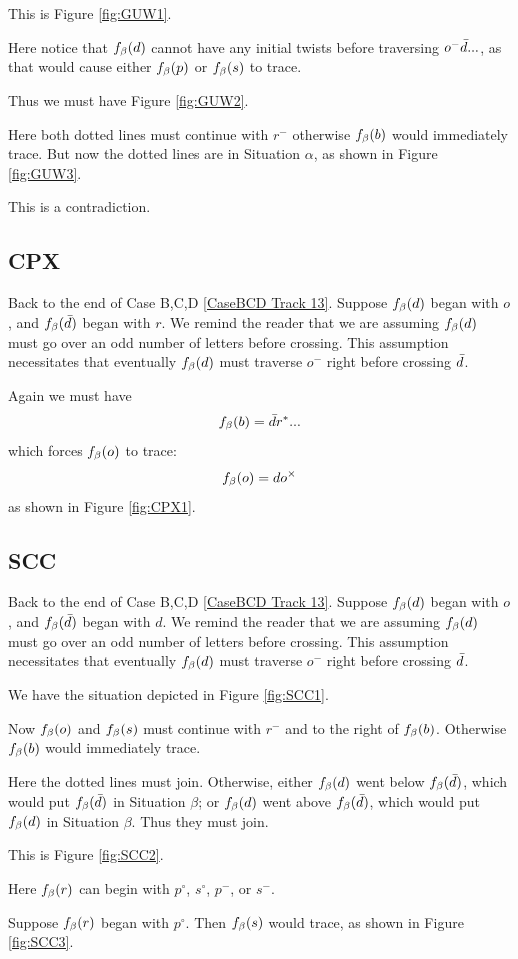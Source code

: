 This is Figure \ref{fig:GUW1}.

Here notice that $f_\beta(d)$ cannot have any initial twists before traversing $o^- \bar{d}...$, as that would cause either $f_\beta(p)$ or $f_\beta(s)$ to trace.

Thus we must have Figure \ref{fig:GUW2}.

Here both dotted lines must continue with $r^-$ otherwise $f_\beta(b)$ would immediately trace. But now the dotted lines are in Situation $\alpha$, as shown in Figure \ref{fig:GUW3}.

This is a contradiction.

\subsection{CPX}\label{CPX}
Back to the end of Case B,C,D \ref{CaseBCD Track 13}.
Suppose $f_\beta(d)$ began with $o$, and $f_\beta(\bar{d})$ began with $r$. We remind the reader that we are assuming $f_\beta(d)$ must go over an odd number of letters before crossing. This assumption necessitates that eventually $f_\beta(d)$ must traverse $o^-$ right before crossing $\bar{d}$.

Again we must have
\[
f_\beta(b) = \bar{d} r^*...
\]
which forces $f_\beta(o)$ to trace:
\[
f_\beta(o) = d o^\times
\]
as shown in Figure \ref{fig:CPX1}.

\subsection{SCC}\label{SCC}
Back to the end of Case B,C,D \ref{CaseBCD Track 13}.
Suppose $f_\beta(d)$ began with $o$, and $f_\beta(\bar{d})$ began with $d$. We remind the reader that we are assuming $f_\beta(d)$ must go over an odd number of letters before crossing. This assumption necessitates that eventually $f_\beta(d)$ must traverse $o^-$ right before crossing $\bar{d}$.

We have the situation depicted in Figure \ref{fig:SCC1}.

Now $f_\beta(o)$ and $f_\beta(s)$ must continue with $r^-$ and to the right of $f_\beta(b)$. Otherwise $f_\beta(b)$ would immediately trace.

Here the dotted lines must join. Otherwise, either $f_\beta(d)$ went below $f_\beta(\bar{d})$, which would put $f_\beta(\bar{d})$ in Situation $\beta$; or $f_\beta(d)$ went above $f_\beta(\bar{d})$, which would put $f_\beta(d)$ in Situation $\beta$. Thus they must join.

This is Figure \ref{fig:SCC2}.

Here $f_\beta(r)$ can begin with $p^\circ$, $s^\circ$, $p^-$, or $s^-$.

Suppose $f_\beta(r)$ began with $p^\circ$. Then $f_\beta(s)$ would trace, as shown in Figure \ref{fig:SCC3}.

